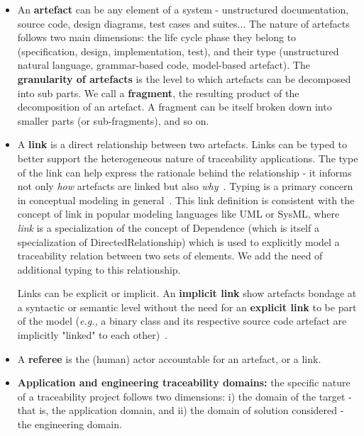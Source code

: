 \begin{itemize}
	\item An \textbf{artefact} can be any element of a system - \eg unstructured documentation, source code, design diagrams, test cases and suites... The nature of artefacts follows two main dimensions: the life cycle phase they belong to (\eg specification, design, implementation, test), and their type (\eg unstructured natural language, grammar-based code, model-based artefact). The \textbf{granularity of artefacts} is the level to which artefacts can be decomposed into sub parts. We call a \textbf{fragment}, the resulting product of the decomposition of an artefact. A fragment can be itself broken down into smaller parts (or sub-fragments), and so on. %
	
	\item A \textbf{link} is a direct relationship between two artefacts. Links can be typed to better support the heterogeneous nature of traceability applications. The type of the link can help express the rationale behind the relationship - it informs not only \textit{how} artefacts are linked but also \textit{why}~\cite{mader2009-motivation-matters-in-traceability-practitioner-survey}. Typing is a primary concern in conceptual modeling in general~\cite{olive2002-representation-of-generic-relationship-types-in-modeling}. %
	This link definition is consistent with the concept of link in popular modeling languages like UML or SysML, where \textit{link} is a specialization of the concept of Dependence (which is itself a specialization of DirectedRelationship) which is used to explicitly model a traceability relation between two sets of elements. We add the need of additional typing to this relationship. 
	
	Links can be explicit or implicit. An \textbf{implicit link} show artefacts bondage at a syntactic or semantic level without the need for an \textbf{explicit link} to be part of the model (\textit{e.g.,} a binary class and its respective source code artefact are implicitly "linked" to each other)~\cite{paige2010-MDE-Traceability-classifications}. 
		
	\item A \textbf{referee} is the (human) actor accountable for an artefact, or a link.
	
	\item \textbf{Application and engineering traceability domains:} the specific nature of a traceability project follows two dimensions: i) the domain of the target - that is, the application domain, and ii) the domain of solution considered - the engineering domain.
	

\end{itemize}
